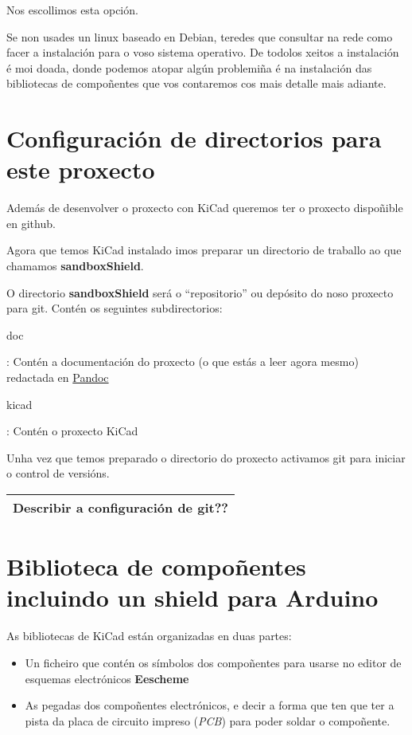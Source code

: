 Nos escollimos esta opción.

Se non usades un linux baseado en Debian, teredes que consultar na rede
como facer a instalación para o voso sistema operativo. De todolos
xeitos a instalación é moi doada, donde podemos atopar algún problemiña
é na instalación das bibliotecas de compoñentes que vos contaremos cos
mais detalle mais adiante.

\section{Configuración de directorios para este
proxecto}\label{configuraciuxf3n-de-directorios-para-este-proxecto}

Además de desenvolver o proxecto con KiCad queremos ter o proxecto
dispoñible en github.

Agora que temos KiCad instalado imos preparar un directorio de traballo
ao que chamamos \textbf{sandboxShield}.

O directorio \textbf{sandboxShield} será o ``repositorio'' ou depósito
do noso proxecto para git. Contén os seguintes subdirectorios:

doc

: Contén a documentación do proxecto (o que estás a leer agora mesmo)
redactada en \href{http://pandoc.org/}{Pandoc}

kicad

: Contén o proxecto KiCad

Unha vez que temos preparado o directorio do proxecto activamos git para
iniciar o control de versións.

\begin{longtable}[c]{@{}l@{}}
\toprule
Describir a configuración de git??\tabularnewline
\bottomrule
\end{longtable}

\section{Biblioteca de compoñentes incluindo un shield para
Arduino}\label{biblioteca-de-compouxf1entes-incluindo-un-shield-para-arduino}

As bibliotecas de KiCad están organizadas en duas partes:

\begin{itemize}
\item
  Un ficheiro que contén os símbolos dos compoñentes para usarse no
  editor de esquemas electrónicos \textbf{Eescheme}
\item
  As pegadas dos compoñentes electrónicos, e decir a forma que ten que
  ter a pista da placa de circuito impreso (\emph{PCB}) para poder
  soldar o compoñente.
\end{itemize}

